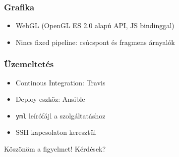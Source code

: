 \documentclass[xetex]{beamer}
\begin{document}
  \begin{frame}
    \frametitle{Grafika}
    \begin{itemize}
      \item WebGL (OpenGL ES 2.0 alapú API, JS bindinggal)
      \item Nincs fixed pipeline: csúcspont és fragmens árnyalók
    \end{itemize}
  \end{frame}
  \begin{frame}
    \frametitle{Üzemeltetés}
    \begin{itemize}
      \item Continous Integration: Travis
      \item Deploy eszköz: Ansible
      \item \texttt{yml} leírófájl a szolgáltatáshoz
      \item SSH kapcsolaton keresztül
    \end{itemize}
  \end{frame}
  \begin{frame}
    \begin{center}
      {\Large Köszönöm a figyelmet! Kérdések? }
    \end{center}
  \end{frame}
\end{document}
